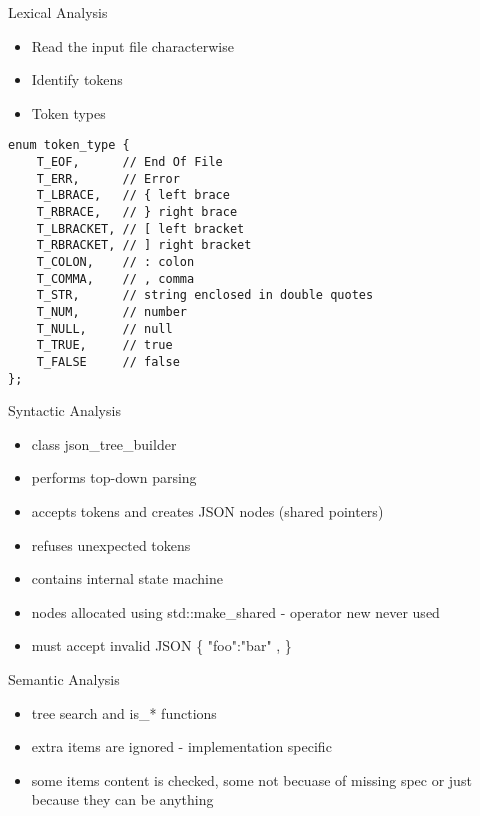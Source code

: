 \documentclass{beamer}
\begin{document}
\begin{frame}[fragile]{Lexical Analysis}

\begin{itemize}
    \item Read the input file characterwise
    \item Identify tokens
    \item Token types
\end{itemize}

\begin{Verbatim}[fontsize=\small]
enum token_type {
    T_EOF,      // End Of File
    T_ERR,      // Error
    T_LBRACE,   // { left brace
    T_RBRACE,   // } right brace
    T_LBRACKET, // [ left bracket
    T_RBRACKET, // ] right bracket
    T_COLON,    // : colon
    T_COMMA,    // , comma
    T_STR,      // string enclosed in double quotes
    T_NUM,      // number
    T_NULL,     // null
    T_TRUE,     // true
    T_FALSE     // false
};
\end{Verbatim}
\end{frame}

\begin{frame}{Syntactic Analysis}
\begin{itemize}
    \item class json\_tree\_builder
    \item performs top-down parsing
    \item accepts tokens and creates JSON nodes (shared pointers)
    \item refuses unexpected tokens
    \item contains internal state machine
    \item nodes allocated using std::make\_shared - operator new never used
    \item must accept invalid JSON \{ "foo":"bar" , \}
\end{itemize}
\end{frame}

\begin{frame}{Semantic Analysis}
\begin{itemize}
	\item tree search and is\_* functions
	\item extra items are ignored - implementation specific
	\item some items content is checked, some not becuase of missing spec or just because they can be anything
\end{itemize}
\end{frame}
\end{document}
